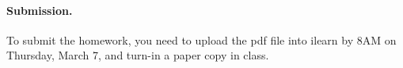 \vskip 0.1in
\paragraph{Submission.}
To submit the homework, you need to upload the pdf file into ilearn by 8AM on Thursday, March 7,
and turn-in a paper copy in class.

\vfill


